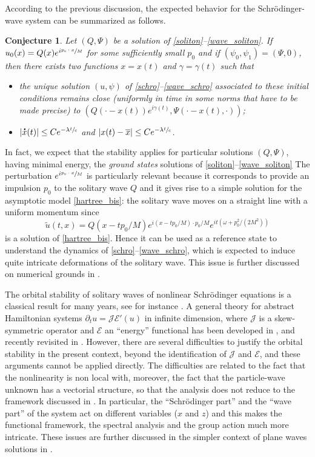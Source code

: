 \documentclass[10pt]{amsart}
\let\bar\oldbar
\let\tilde\oldtilde
\newtheorem{conj}[lemma]{Conjecture}
\theoremstyle{definition}
\newcommand*{\overbigdot}[1]{%
\accentset{\mbox{\large\bfseries .}}{#1}}
\let\bar\overline
\let\tilde\widetilde
\begin{document}
According to the previous discussion, the expected behavior for the Schrödinger-wave system can be summarized as follows.
\begin{conj}
Let $(Q,\Psi)$ be a solution of \eqref{soliton}--\eqref{wave_soliton}.
If $u_{0}(x)=Q(x)e^{i\sfrac{p_{0}\cdot x}{M}}$ for some sufficiently small $p_{0}$ and if $(\psi_{0},\psi_{1})=(\Psi,0)$, then there exists two functions $x=x(t)$ and $\gamma=\gamma(t)$ such that
\begin{itemize}
\item the unique solution $(u,\psi)$ of \eqref{schro}--\eqref{wave_schro} associated to these initial conditions remains close (uniformly in time in some norms that have to be made precise) to $(Q(\cdot-x(t))e^{i\gamma(t)},\Psi(\cdot-x(t),\cdot))$;
\item $|\overbigdot{x}(t)|\leq C e^{-\lambda\sfrac{t}{c}}$ and $|x(t)-\bar{x}|\leq C e^{-\lambda\sfrac{t}{c}}$.
\end{itemize}
\end{conj}

In fact, we expect that the stability applies for particular solutions $(Q,\Psi)$, having minimal energy, the \emph{ground states} solutions of \eqref{soliton}--\eqref{wave_soliton}
The perturbation $e^{i\sfrac{p_{0}\cdot x}{M}}$ is particularly relevant because
it corresponds to provide an impulsion $p_0$ to the solitary wave
$Q$ and it gives rise
to a simple solution for the asymptotic model \eqref{hartree_bis}:
the solitary wave moves on a straight
line with a uniform momentum
since
\[
\tilde u(t,x)=Q(x-tp_0/M)e^{i(x-tp_0/M)\cdot p_0/M}e^{it(\omega +p_0^2/(2M^2))}
\]
is a solution of \eqref{hartree_bis}.
Hence it can be used as a reference state to understand the dynamics of
\eqref{schro}--\eqref{wave_schro}, which is expected to induce
quite intricate deformations of the solitary wave. This issue is further discussed
on numerical grounds in \cite{LVNum1}.

The orbital stability of solitary waves of nonlinear Schrödinger equations is a classical result for many years, see for instance \cite{Cazenave_Lions_orbital_stab,Weinstein1,Weinstein2}.
A general theory for abstract Hamiltonian systems $\partial_t u=\mathscr J \mathscr E'(u)$
in infinite dimension, where $\mathscr J$ is a skew-symmetric operator and $\mathscr E$ an ``energy'' functional
has been developed in \cite{GSS,GSS2}, and recently revisited in \cite{SRN1}.
However, there are several difficulties to justify the orbital stability in the present context, beyond the identification of $\mathscr J$ and $\mathscr E$, and these arguments cannot be applied directly.
The difficulties are
related to the fact that the nonlinearity is non local with, moreover,
the fact that the particle-wave unknown has a vectorial structure, so that the analysis does not reduce to the framework discussed in \cite{GSS,GSS2}.
In particular,
the ``Schrödinger part'' and the ``wave part'' of the system act on different variables ($x$ and $z$)
and this makes the functional framework, the spectral analysis and the group action much more intricate.
These issues are further discussed in the simpler context of plane waves solutions in \cite{GRN}.
\end{document}
